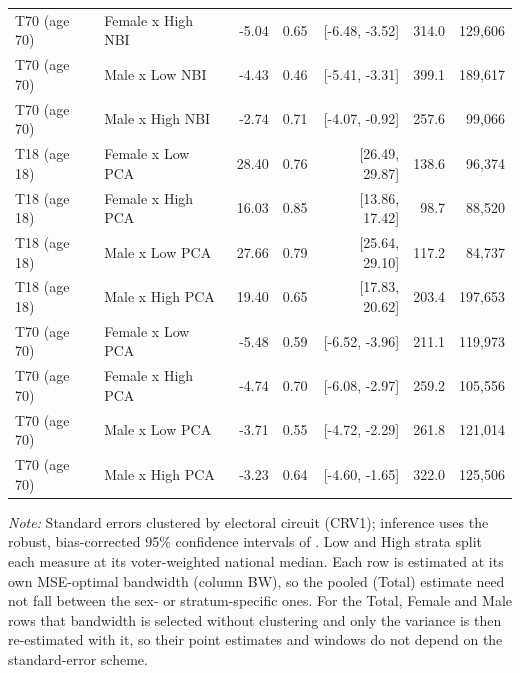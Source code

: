 \begin{table}[ht]
{\begin{tabular}{llrrrrr}
T70 (age 70) & Female x High NBI & -5.04 & 0.65 & [-6.48, -3.52] & 314.0 & 129,606 \\
T70 (age 70) & Male x Low NBI & -4.43 & 0.46 & [-5.41, -3.31] & 399.1 & 189,617 \\
T70 (age 70) & Male x High NBI & -2.74 & 0.71 & [-4.07, -0.92] & 257.6 & 99,066 \\
T18 (age 18) & Female x Low PCA & 28.40 & 0.76 & [26.49, 29.87] & 138.6 & 96,374 \\
T18 (age 18) & Female x High PCA & 16.03 & 0.85 & [13.86, 17.42] & 98.7 & 88,520 \\
T18 (age 18) & Male x Low PCA & 27.66 & 0.79 & [25.64, 29.10] & 117.2 & 84,737 \\
T18 (age 18) & Male x High PCA & 19.40 & 0.65 & [17.83, 20.62] & 203.4 & 197,653 \\
T70 (age 70) & Female x Low PCA & -5.48 & 0.59 & [-6.52, -3.96] & 211.1 & 119,973 \\
T70 (age 70) & Female x High PCA & -4.74 & 0.70 & [-6.08, -2.97] & 259.2 & 105,556 \\
T70 (age 70) & Male x Low PCA & -3.71 & 0.55 & [-4.72, -2.29] & 261.8 & 121,014 \\
T70 (age 70) & Male x High PCA & -3.23 & 0.64 & [-4.60, -1.65] & 322.0 & 125,506 \\
\bottomrule
\end{tabular}%
}
\par\vspace{0.6em}
{\footnotesize\begin{minipage}{\linewidth}\emph{Note:} Standard errors clustered by electoral circuit (CRV1); inference uses the robust, bias-corrected 95\% confidence intervals of \citet{calonico2014}. Low and High strata split each measure at its voter-weighted national median. Each row is estimated at its own MSE-optimal bandwidth (column BW), so the pooled (Total) estimate need not fall between the sex- or stratum-specific ones. For the Total, Female and Male rows that bandwidth is selected without clustering and only the variance is then re-estimated with it, so their point estimates and windows do not depend on the standard-error scheme.\end{minipage}}
\end{table}
